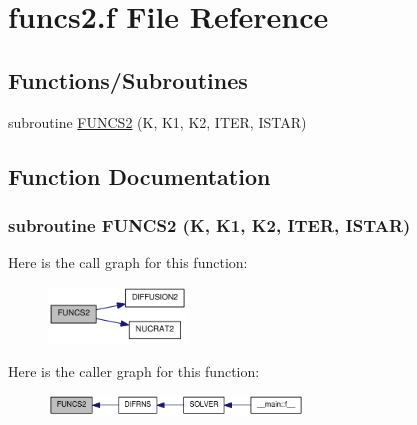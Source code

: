 \hypertarget{funcs2_8f}{
\section{funcs2.f File Reference}
\label{funcs2_8f}
}
\subsection*{Functions/Subroutines}
\begin{DoxyCompactItemize}
\item 
subroutine \hyperlink{funcs2_8f_a90dca890552333d553e8bfbf5c9d70c1}{FUNCS2} (K, K1, K2, ITER, ISTAR)
\end{DoxyCompactItemize}


\subsection{Function Documentation}
\hypertarget{funcs2_8f_a90dca890552333d553e8bfbf5c9d70c1}{
\subsubsection[{FUNCS2}]{\setlength{\rightskip}{0pt plus 5cm}subroutine FUNCS2 (K, \/  K1, \/  K2, \/  ITER, \/  ISTAR)}}
\label{funcs2_8f_a90dca890552333d553e8bfbf5c9d70c1}


Here is the call graph for this function:\nopagebreak
\begin{figure}[H]
\begin{center}
\leavevmode
\includegraphics[width=105pt]{funcs2_8f_a90dca890552333d553e8bfbf5c9d70c1_cgraph}
\end{center}
\end{figure}


Here is the caller graph for this function:\nopagebreak
\begin{figure}[H]
\begin{center}
\leavevmode
\includegraphics[width=192pt]{funcs2_8f_a90dca890552333d553e8bfbf5c9d70c1_icgraph}
\end{center}
\end{figure}
